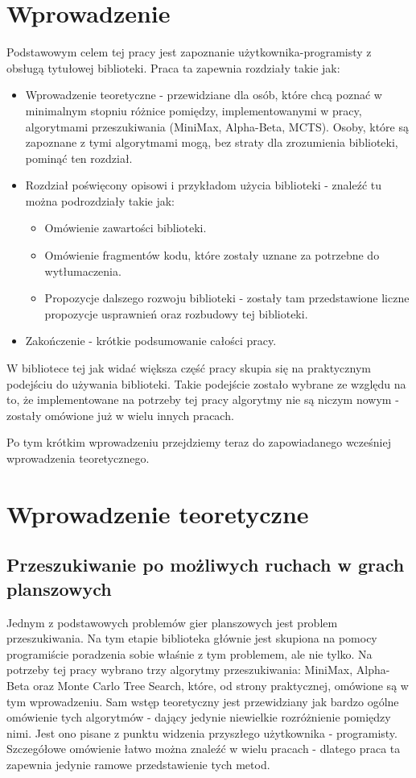 \documentclass[declaration,shortabstract,inz]{iithesis}
\author         {Mikołaj Kowalik}
\begin{document}

\chapter{Wprowadzenie}
Podstawowym celem tej pracy jest zapoznanie użytkownika-programisty z obsługą tytułowej biblioteki.
Praca ta zapewnia rozdziały takie jak:
\begin{itemize}
  \item Wprowadzenie teoretyczne - przewidziane dla osób, które chcą poznać w minimalnym stopniu różnice pomiędzy, implementowanymi w pracy, algorytmami przeszukiwania (MiniMax, Alpha-Beta, MCTS). Osoby, które są zapoznane z tymi algorytmami mogą, bez straty dla zrozumienia biblioteki, pominąć ten rozdział.
  \item Rozdział poświęcony opisowi i przykładom użycia biblioteki - znaleźć tu można podrozdziały takie jak:
    \begin{itemize}
      \item Omówienie zawartości biblioteki.
      \item Omówienie fragmentów kodu, które zostały uznane za potrzebne do wytłumaczenia.
      \item Propozycje dalszego rozwoju biblioteki - zostały tam przedstawione liczne propozycje usprawnień oraz rozbudowy tej biblioteki.
    \end{itemize}
  \item Zakończenie - krótkie podsumowanie całości pracy.
\end{itemize}

W bibliotece tej jak widać większa część pracy skupia się na praktycznym podejściu do używania biblioteki.
Takie podejście zostało wybrane ze względu na to, że implementowane na potrzeby tej pracy algorytmy nie są niczym nowym - zostały omówione już w wielu innych pracach.

Po tym krótkim wprowadzeniu przejdziemy teraz do zapowiadanego wcześniej wprowadzenia teoretycznego.


\chapter{Wprowadzenie teoretyczne}
\section{Przeszukiwanie po możliwych ruchach w grach planszowych}
Jednym z podstawowych problemów gier planszowych jest problem przeszukiwania.
Na tym etapie biblioteka głównie jest skupiona na pomocy programiście poradzenia sobie właśnie z tym problemem, ale nie tylko.
Na potrzeby tej pracy wybrano trzy algorytmy przeszukiwania: MiniMax, Alpha-Beta oraz Monte Carlo Tree Search, które, od strony praktycznej, omówione są w tym wprowadzeniu.
Sam wstęp teoretyczny jest przewidziany jak bardzo ogólne omówienie tych algorytmów - dający jedynie niewielkie rozróżnienie pomiędzy nimi.
Jest ono pisane z punktu widzenia przyszłego użytkownika - programisty.
Szczegółowe omówienie łatwo można znaleźć w wielu pracach - dlatego praca ta zapewnia jedynie ramowe przedstawienie tych metod.
\end{document}
